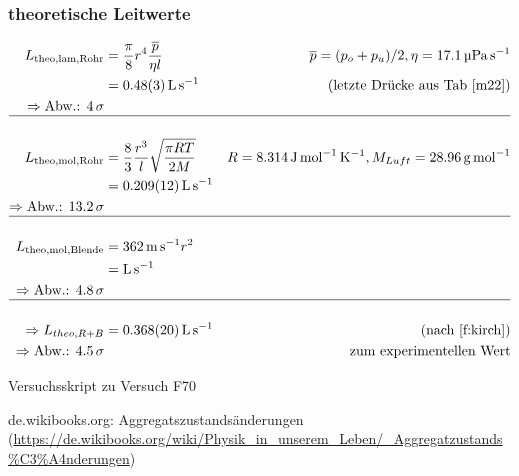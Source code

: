 \documentclass[12pt, a4paper]{scrartcl}
\begin{document}
        \subsubsection*{theoretische Leitwerte}
        
        \begin{align}
        	L_{\text{theo,lam,Rohr}}&=\frac{\pi}{8} r^4 \frac{\overline p}{\eta l}&\overline p = (p_o+p_u)/2, \eta= 
        	\SI{17.1}{\micro\pascal\per\second}\\
        	&= \SI{0.48+-0.03}{\litre\per\second} &\text{(letzte Drücke aus Tab \ref{m22})}\\
        	\Rightarrow \text{Abw.: } \SI{4}{\sigma}\\
        	\hline\nonumber\\
        	L_{\text{theo,mol,Rohr}}&=\frac 8 3 \frac{r^3}{l} \sqrt{\frac{\pi R T}{2 M}} &R=\SI{8.314}{\joule\per\mole\per\kelvin}, M_{Luft} = \SI{28.96}{\gram\per\mole}\\
        	&=\SI{.209+-.012}{\litre\per\second}\\
        	\Rightarrow \text{Abw.: } \SI{13.2}{\sigma}\\
        	\hline\nonumber\\
        	L_{\text{theo,mol,Blende}}
        	&=\SI{362}{\meter\per\second} r^2\\
        	&=\SI{}{\litre\per\second}\\
        	\Rightarrow \text{Abw.: } \SI{4.8}{\sigma}\\
        	\hline\nonumber\\
        	\Rightarrow L_{theo,R+B} 
        	&= \SI{.368+-.02}{\litre\per\second}
        	&(\text{nach }\ref{f:kirch})\\
        	\Rightarrow \text{Abw.: \SI{4.5}{\sigma}}&&\text{zum experimentellen Wert}
        \end{align}
	
	
	\newpage 
	
	\begin{thebibliography}{00}   %
		
		 Versuchsskript zu Versuch F70
		
		 de.wikibooks.org: Aggregatszustandsänderungen\\ (\url{https://de.wikibooks.org/wiki/Physik_in_unserem_Leben/_Aggregatzustands%C3%A4nderungen})
		
	\end{thebibliography}
	
\end{document}
